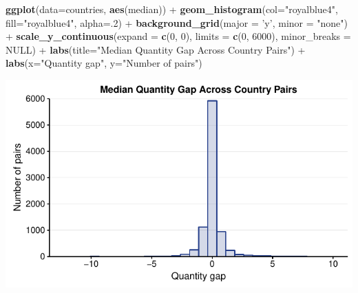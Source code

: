 \documentclass[10pt,]{article}
\newenvironment{Shaded}{\begin{snugshade}}{\end{snugshade}}
\newcommand{\KeywordTok}[1]{\textcolor[rgb]{0.13,0.29,0.53}{\textbf{{#1}}}}
\newcommand{\DataTypeTok}[1]{\textcolor[rgb]{0.13,0.29,0.53}{{#1}}}
\newcommand{\DecValTok}[1]{\textcolor[rgb]{0.00,0.00,0.81}{{#1}}}
\newcommand{\StringTok}[1]{\textcolor[rgb]{0.31,0.60,0.02}{{#1}}}
\newcommand{\OtherTok}[1]{\textcolor[rgb]{0.56,0.35,0.01}{{#1}}}
\newcommand{\NormalTok}[1]{{#1}}
\begin{document}
\begin{Shaded}
\begin{Highlighting}[]
\KeywordTok{ggplot}\NormalTok{(}\DataTypeTok{data=}\NormalTok{countries, }\KeywordTok{aes}\NormalTok{(median)) +}
\StringTok{  }\KeywordTok{geom_histogram}\NormalTok{(}\DataTypeTok{col=}\StringTok{"royalblue4"}\NormalTok{,}
                 \DataTypeTok{fill=}\StringTok{"royalblue4"}\NormalTok{,}
                 \DataTypeTok{alpha=}\NormalTok{.}\DecValTok{2}\NormalTok{) +}
\StringTok{  }\KeywordTok{background_grid}\NormalTok{(}\DataTypeTok{major =} \StringTok{'y'}\NormalTok{, }\DataTypeTok{minor =} \StringTok{"none"}\NormalTok{) +}
\StringTok{  }\KeywordTok{scale_y_continuous}\NormalTok{(}\DataTypeTok{expand =} \KeywordTok{c}\NormalTok{(}\DecValTok{0}\NormalTok{, }\DecValTok{0}\NormalTok{), }\DataTypeTok{limits =} \KeywordTok{c}\NormalTok{(}\DecValTok{0}\NormalTok{, }\DecValTok{6000}\NormalTok{), }\DataTypeTok{minor_breaks =} \OtherTok{NULL}\NormalTok{) +}
\StringTok{  }\KeywordTok{labs}\NormalTok{(}\DataTypeTok{title=}\StringTok{"Median Quantity Gap Across Country Pairs"}\NormalTok{) +}
\StringTok{  }\KeywordTok{labs}\NormalTok{(}\DataTypeTok{x=}\StringTok{"Quantity gap"}\NormalTok{, }\DataTypeTok{y=}\StringTok{"Number of pairs"}\NormalTok{)}
\end{Highlighting}
\end{Shaded}

\begin{center}\includegraphics{Figs/qty_summary-7} \end{center}
\end{document}
